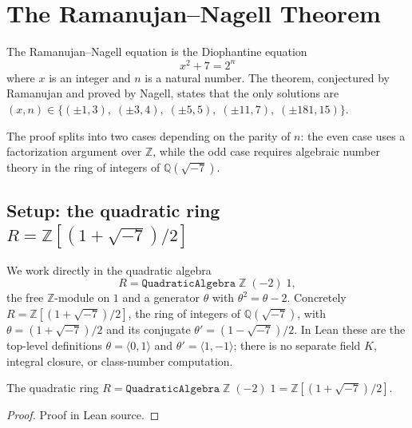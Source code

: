 %

\chapter{The Ramanujan--Nagell Theorem}

The Ramanujan--Nagell equation is the Diophantine equation
\[
  x^2 + 7 = 2^n
\]
where $x$ is an integer and $n$ is a natural number. The theorem, conjectured by
Ramanujan and proved by Nagell, states that the only solutions are
$(x, n) \in \{(\pm 1, 3),\; (\pm 3, 4),\; (\pm 5, 5),\; (\pm 11, 7),\; (\pm 181, 15)\}$.

The proof splits into two cases depending on the parity of $n$: the even case uses a
factorization argument over $\mathbb{Z}$, while the odd case requires algebraic number
theory in the ring of integers of $\mathbb{Q}(\sqrt{-7})$.

\section{Setup: the quadratic ring $R = \mathbb{Z}[(1+\sqrt{-7})/2]$}

We work directly in the quadratic algebra
\[
  R = \texttt{QuadraticAlgebra}\;\mathbb{Z}\;(-2)\;1,
\]
the free $\mathbb{Z}$-module on $1$ and a generator $\theta$ with
$\theta^2 = \theta - 2$. Concretely $R = \mathbb{Z}[(1+\sqrt{-7})/2]$, the ring of
integers of $\mathbb{Q}(\sqrt{-7})$, with $\theta = (1+\sqrt{-7})/2$ and its
conjugate $\theta' = (1-\sqrt{-7})/2$. In Lean these are the top-level
definitions $\theta = \langle 0, 1\rangle$ and $\theta' = \langle 1, -1\rangle$;
there is no separate field $K$, integral closure, or class-number computation.

\begin{definition}[R]
  \label{def:R}
  \leanok
  The quadratic ring $R = \texttt{QuadraticAlgebra}\;\mathbb{Z}\;(-2)\;1 = \mathbb{Z}[(1+\sqrt{-7})/2]$.
\end{definition}
\begin{proof}\leanok
  Proof in Lean source.
\end{proof}

